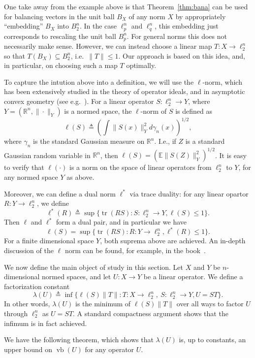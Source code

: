 \documentclass[11pt]{article}
\newcommand{\cut}[1]{}
\newcommand{\R}{{\mathbb{R}}}
\newcommand{\E}{\mathbb{E}}
\newcommand{\eqdef}{\triangleq}
\DeclareMathOperator{\vb}{vb}
\DeclareMathOperator{\tr}{tr}
\DeclareMathOperator{\rank}{rk}
\begin{document}
One take away from the example above is that Theorem~\ref{thm:bana}
can be used for balancing vectors in the unit ball $B_X$ of any norm
$X$ by appropriately ``embedding'' $B_X$ into $B_2^n$. In the case
$\ell^n_p$ and $\ell^n_q$, this embedding just corresponds to
rescaling the unit ball $B_p^n$. For general norms this does not
necessarily make sense. However, we can instead choose a linear map $T:X \to
\ell_2^n$ so that $T(B_X) \subseteq B_2^n$, i.e.~$\|T\| \le 1$. Our
approach is based on this idea, and, in particular, on choosing such a
map $T$ optimally.

To capture the intution above into a definition, we will use the
$\ell$-norm, which has been extensively studied in the theory of
operator ideals, and in asymptotic convex geometry (see
e.g.~\cite{TJ-book,Pisier-book,AGM-book}). For a linear operator
$S:\ell_2^n \to Y$, where $Y = (\R^n, \|\cdot\|_Y)$ is a normed space,
the $\ell$-norm of $S$ is defined as
\[
\ell(S) \eqdef \left( \int \|S(x)\|_Y^2 d\gamma_n(x) \right)^{1/2},
\]
where $\gamma_n$ is the standard Gaussian measure on $\R^n$. I.e., if
$Z$ is a standard Gaussian random variable in $\R^n$, then $\ell(S) =
(\E \|S(Z)\|_Y^2)^{1/2}$. It is easy to verify that $\ell(\cdot)$ is a
norm on the space of linear operators from $\ell_2^n$ to $Y$, for any
normed space $Y$ as above. 

Moreover, we can define a dual norm $\ell^*$ via trace duality: for
any linear opartor $R: Y \to \ell_2^n$, we define
\[
\ell^*(R) \eqdef \sup\{\tr(RS): S: \ell_2^n \to Y, \ell(S) \le 1\}.
\]
Then $\ell$ and $\ell^*$ form a dual pair, and in particular we have
\[
\ell(S) = \sup\{\tr(RS): R:Y\to\ell_2^n, \ell^*(R) \le 1\}.
\]
For a finite dimensional space $Y$, both suprema above are achieved.
An in-depth discussion of the $\ell$ norm can be found, for example,
in the book~\cite{TJ-book}.



We now define the main object of study in this section. Let $X$ and
$Y$ be $n$-dimensional normed spaces, and let $U:X \to Y$ be a
linear operator. We define a factorization constant
\[
\lambda(U) \eqdef \inf \{\ell(S)\|T\|: T: X \to \ell_2^n,\ S: \ell_2^n
\to Y, U = ST\}.
\]
In other words, $\lambda(U)$ is the minimum of $\ell(S)\|T\|$ over all
ways to factor $U$ through $\ell_2^n$ as $U = ST$. A standard
compactness argument shows that the infimum is in fact achieved. 

\cut{It is
also worth noting that we can choose the operator $T$ to map $X$ to
$\ell_2^m$, and $S$ to map $\ell_2^m$ to $Y$, for any $m \ge
\rank(U)$, without changing the value of $\lambda(U)$. The reason is
that, if we choose $W$ to be the subspace of $\R^m$ of dimension $r
\eqdef \rank(U)$ such that $S(W)$ equals the range of $U$, then we can
replace $S$ with $S\pi$ and $T$ with $\pi T$, where $\pi:\ell_2^m
\to\ell_2^{r}$ is the orthogonal projection that sends $W$ to
$\R^{r}$. This is still a factorization of $U$ and the norms $\ell(S)$
and $\|T\|$ remain unchanged.}
We have the following theorem, which shows that $\lambda(U)$ is, up to
constants, an upper bound on $\vb(U)$ for any operator $U$. 
\end{document}
